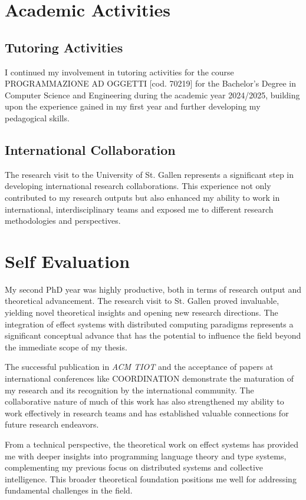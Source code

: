 \documentclass[runningheads]{llncs}
\begin{document}
\section{Academic Activities}

\subsection{Tutoring Activities}

I continued my involvement in tutoring activities for the course PROGRAMMAZIONE AD OGGETTI [cod. 70219] for the Bachelor's Degree in Computer Science and Engineering during the academic year 2024/2025, building upon the experience gained in my first year and further developing my pedagogical skills.

\subsection{International Collaboration}

The research visit to the University of St. Gallen represents a significant step in developing international research collaborations. This experience not only contributed to my research outputs but also enhanced my ability to work in international, interdisciplinary teams and exposed me to different research methodologies and perspectives.

\section{Self Evaluation}

My second PhD year was highly productive, both in terms of research output and theoretical advancement.
%
The research visit to St. Gallen proved invaluable,
yielding novel theoretical insights and opening new research directions.
%
The integration of effect systems with distributed computing paradigms represents a significant conceptual advance that has the potential to influence the field beyond the immediate scope of my thesis.

The successful publication in \emph{ACM TIOT} and the acceptance of papers at international conferences like COORDINATION demonstrate the maturation of my research and its recognition by the international community.
%
The collaborative nature of much of this work has also strengthened my ability to work effectively in research teams and has established valuable connections for future research endeavors.

From a technical perspective,
the theoretical work on effect systems has provided me with deeper insights into programming language theory and type systems,
complementing my previous focus on distributed systems and collective intelligence.
%
This broader theoretical foundation positions me well for addressing fundamental challenges in the field.
\end{document}
